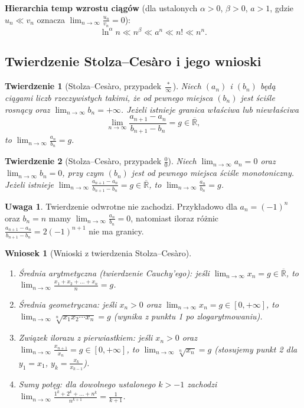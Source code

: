 \documentclass[11pt, a4paper]{article}
\theoremstyle{plain}
\newtheorem*{twierdzenie}{Twierdzenie}
\newtheorem*{wniosek}{Wniosek}
\theoremstyle{definition}
\newtheorem*{uwaga}{Uwaga}
\begin{document}
\noindent\textbf{Hierarchia temp wzrostu ciągów} (dla ustalonych $\alpha > 0$, $\beta > 0$, $a > 1$, gdzie $u_n \ll v_n$ oznacza $\lim_{n\to\infty} \frac{u_n}{v_n} = 0$):
\[
\ln^\alpha n \ll n^\beta \ll a^n \ll n! \ll n^n.
\]

\subsection{Twierdzenie Stolza--Cesàro i jego wnioski}

\begin{twierdzenie}[Stolza--Cesàro, przypadek $\frac{*}{\infty}$]
Niech $(a_n)$ i $(b_n)$ będą ciągami liczb rzeczywistych takimi, że od pewnego miejsca $(b_n)$ jest ściśle rosnący oraz $\lim_{n\to\infty} b_n = +\infty$. Jeżeli istnieje granica właściwa lub niewłaściwa
\[
\lim_{n\to\infty} \frac{a_{n+1} - a_n}{b_{n+1} - b_n} = g \in \overline{\mathbb{R}},
\]
to $\lim_{n\to\infty} \frac{a_n}{b_n} = g$.
\end{twierdzenie}

\begin{twierdzenie}[Stolza--Cesàro, przypadek $\frac{0}{0}$]
Niech $\lim_{n\to\infty} a_n = 0$ oraz $\lim_{n\to\infty} b_n = 0$, przy czym $(b_n)$ jest od pewnego miejsca ściśle monotoniczny. Jeżeli istnieje $\lim_{n\to\infty} \frac{a_{n+1} - a_n}{b_{n+1} - b_n} = g \in \overline{\mathbb{R}}$, to $\lim_{n\to\infty} \frac{a_n}{b_n} = g$.
\end{twierdzenie}

\begin{uwaga}
Twierdzenie odwrotne nie zachodzi. Przykładowo dla $a_n = (-1)^n$ oraz $b_n = n$ mamy $\lim_{n\to\infty} \frac{a_n}{b_n} = 0$, natomiast iloraz różnic $\frac{a_{n+1} - a_n}{b_{n+1} - b_n} = 2(-1)^{n+1}$ nie ma granicy.
\end{uwaga}

\begin{wniosek}[Wnioski z twierdzenia Stolza--Cesàro]
\begin{enumerate}
    \item \emph{Średnia arytmetyczna (twierdzenie Cauchy'ego):} jeśli $\lim_{n\to\infty} x_n = g \in \overline{\mathbb{R}}$, to $\lim_{n\to\infty} \frac{x_1 + x_2 + \dots + x_n}{n} = g$.
    \item \emph{Średnia geometryczna:} jeśli $x_n > 0$ oraz $\lim_{n\to\infty} x_n = g \in [0, +\infty]$, to $\lim_{n\to\infty} \sqrt[n]{x_1 x_2 \cdots x_n} = g$ (wynika z punktu 1 po zlogarytmowaniu).
    \item \emph{Związek ilorazu z pierwiastkiem:} jeśli $x_n > 0$ oraz $\lim_{n\to\infty} \frac{x_{n+1}}{x_n} = g \in [0, +\infty]$, to $\lim_{n\to\infty} \sqrt[n]{x_n} = g$ (stosujemy punkt 2 dla $y_1 = x_1$, $y_k = \frac{x_k}{x_{k-1}}$).
    \item \emph{Sumy potęg:} dla dowolnego ustalonego $k > -1$ zachodzi $\lim_{n\to\infty} \frac{1^k + 2^k + \dots + n^k}{n^{k+1}} = \frac{1}{k+1}$.
\end{enumerate}
\end{wniosek}
\end{document}
